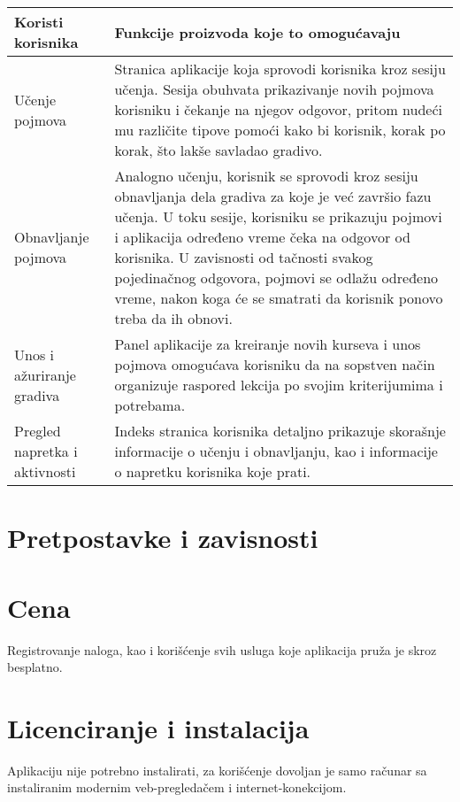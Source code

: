 \begin{center}
    \begin{tabular}{|m{3cm}|m{7cm}|}
        \hline
        Koristi korisnika &
        Funkcije proizvoda koje to omogućavaju\\
        \hline
        Učenje pojmova &
        Stranica aplikacije koja sprovodi korisnika kroz sesiju učenja. Sesija obuhvata prikazivanje novih pojmova korisniku i čekanje na njegov odgovor, pritom nudeći mu različite tipove pomoći kako bi korisnik, korak po korak, što lakše savladao gradivo.\\
        \hline
        Obnavljanje pojmova &
        Analogno učenju, korisnik se sprovodi kroz sesiju obnavljanja dela gradiva za koje je već završio fazu učenja. U toku sesije, korisniku se prikazuju pojmovi i aplikacija određeno vreme čeka na odgovor od korisnika. U zavisnosti od tačnosti svakog pojedinačnog odgovora, pojmovi se odlažu određeno vreme, nakon koga će se smatrati da korisnik ponovo treba da ih obnovi.\\
        \hline
        Unos i ažuriranje gradiva &
        Panel aplikacije za kreiranje novih kurseva i unos pojmova omogućava korisniku da na sopstven način organizuje raspored lekcija po svojim kriterijumima i potrebama.\\
        \hline
        Pregled napretka i aktivnosti &
        Indeks stranica korisnika detaljno prikazuje skorašnje informacije o učenju i obnavljanju, kao i informacije o napretku korisnika koje prati.
        \\
        \hline
    \end{tabular}
\end{center}

\section{Pretpostavke i zavisnosti}
\section{Cena}
Registrovanje naloga, kao i korišćenje svih usluga koje aplikacija pruža je skroz besplatno.
\section{Licenciranje i instalacija}
Aplikaciju nije potrebno instalirati, za korišćenje dovoljan je samo računar sa instaliranim modernim veb-pregledačem i internet-konekcijom.



